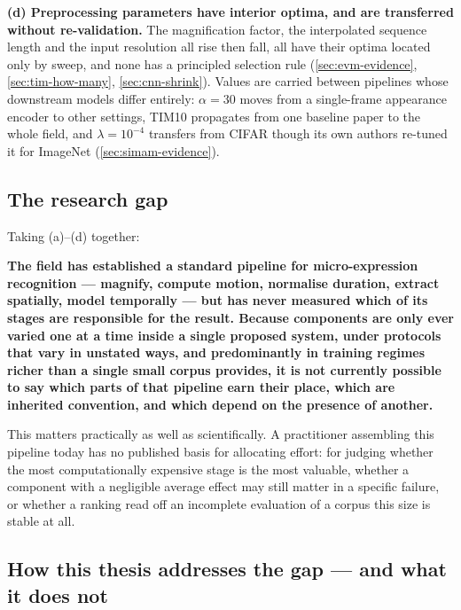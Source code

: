 \textbf{(d) Preprocessing parameters have interior optima, and are transferred without re-validation.} The magnification factor, the interpolated sequence length and the input resolution all rise then fall, all have their optima located only by sweep, and none has a principled selection rule (\autoref{sec:evm-evidence}, \autoref{sec:tim-how-many}, \autoref{sec:cnn-shrink}). Values are carried between pipelines whose downstream models differ entirely: $\alpha = 30$ moves from a single-frame appearance encoder to other settings, TIM10 propagates from one baseline paper to the whole field, and $\lambda = 10^{-4}$ transfers from CIFAR though its own authors re-tuned it for ImageNet (\autoref{sec:simam-evidence}).

\subsection{The research gap}
\label{sec:research-gap}

Taking (a)--(d) together:

\textbf{The field has established a standard pipeline for micro-expression recognition --- magnify, compute motion, normalise duration, extract spatially, model temporally --- but has never measured which of its stages are responsible for the result. Because components are only ever varied one at a time inside a single proposed system, under protocols that vary in unstated ways, and predominantly in training regimes richer than a single small corpus provides, it is not currently possible to say which parts of that pipeline earn their place, which are inherited convention, and which depend on the presence of another.}

This matters practically as well as scientifically. A practitioner assembling this pipeline today has no published basis for allocating effort: for judging whether the most computationally expensive stage is the most valuable, whether a component with a negligible average effect may still matter in a specific failure, or whether a ranking read off an incomplete evaluation of a corpus this size is stable at all.

\subsection{How this thesis addresses the gap --- and what it does not}
\label{sec:addressing-gap}

